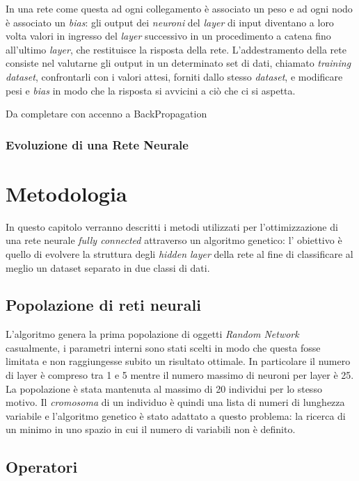 \documentclass[12pt,a4paper]{report}
\begin{document}
In una rete come questa ad ogni collegamento è associato un peso e ad ogni nodo è associato un \textit{bias}: gli output dei \textit{neuroni} del \textit{layer} di input diventano a loro volta valori in ingresso del \textit{layer} successivo in un procedimento a catena fino all'ultimo \textit{layer}, che restituisce la risposta della rete. 
L'addestramento della rete consiste nel valutarne gli output in un determinato set di dati, chiamato \textit{training dataset}, confrontarli con i valori attesi, forniti dallo stesso \textit{dataset}, e modificare pesi e \textit{bias} in modo che la risposta si avvicini a ciò che ci si aspetta.


Da completare con accenno a BackPropagation

\subsection{Evoluzione di una Rete Neurale}

\chapter{Metodologia}

In questo capitolo verranno descritti i metodi utilizzati per l'ottimizzazione di una rete neurale \textit{fully connected} attraverso un algoritmo genetico: l' obiettivo è quello di evolvere la struttura degli \textit{hidden layer} della rete al fine di classificare al meglio 
un dataset separato in due classi di dati.

\section{Popolazione di reti neurali}

L'algoritmo genera la prima popolazione di oggetti \textit{Random Network} casualmente, i parametri interni sono stati scelti in modo che questa fosse limitata e non raggiungesse subito un risultato ottimale.
In particolare il numero di layer è compreso tra 1 e 5 mentre il numero massimo di neuroni per layer è 25.
La popolazione è stata mantenuta al massimo di 20 individui per lo stesso motivo.
Il \textit{cromosoma} di un individuo è quindi una lista di numeri di lunghezza variabile e l'algoritmo genetico è stato adattato a questo problema: la ricerca di un minimo in uno spazio in cui il numero di variabili non è definito.

\section{Operatori}
\end{document}
